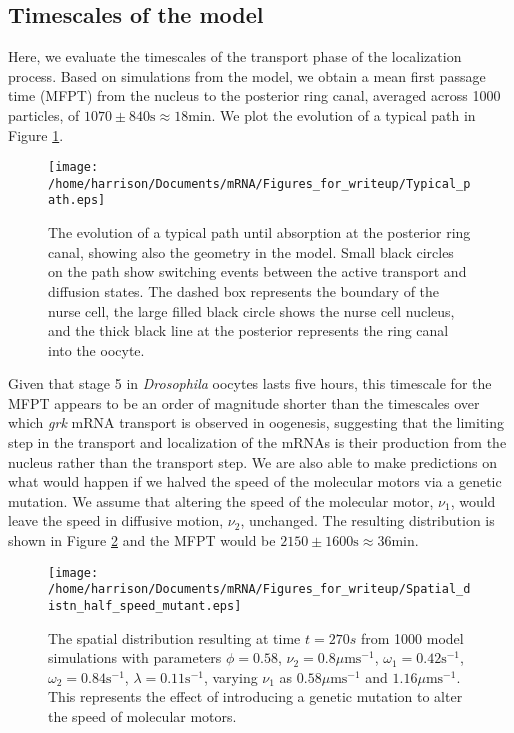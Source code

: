 \documentclass[twocolumn]{biophys}
\begin{document}
\subsection{Timescales of the model}
Here, we evaluate the timescales of the transport phase of the localization process.
Based on simulations from the model, we obtain a mean first passage time (MFPT) from the nucleus to the posterior ring canal, averaged across 1000 particles, of $1070 \pm 840 \text{s} \approx 18 \text{min}$.
We plot the evolution of a typical path in Figure \ref{FIG:Typical_path}.
\begin{figure}[h]
 \centering
 \texttt{[image: /home/harrison/Documents/mRNA/Figures\_for\_writeup/Typical\_path.eps]}
 \caption{The evolution of a typical path until absorption at the posterior ring canal, showing also the geometry in the model. Small black circles on the path show switching events between the active transport and diffusion states. The dashed box represents the boundary of the nurse cell, the large filled black circle shows the nurse cell nucleus, and the thick black line at the posterior represents the ring canal into the oocyte.}
 \label{FIG:Typical_path}
\end{figure}
Given that stage 5 in \textit{Drosophila} oocytes lasts five hours, this timescale for the MFPT appears to be an order of magnitude shorter than the timescales over which \textit{grk} mRNA transport is observed in oogenesis, suggesting that the limiting step in the transport and localization of the mRNAs is their production from the nucleus rather than the transport step.
We are also able to make predictions on what would happen if we halved the speed of the molecular motors via a genetic mutation.
We assume that altering the speed of the molecular motor, $\nu_1$, would leave the speed in diffusive motion, $\nu_2$, unchanged.
The resulting distribution is shown in Figure \ref{FIG:Half_speed_q} and the MFPT would be $2150\pm1600 \text{s} \approx 36\text{min}$.
\begin{figure}[h]
 \centering
 \texttt{[image: /home/harrison/Documents/mRNA/Figures\_for\_writeup/Spatial\_distn\_half\_speed\_mutant.eps]}
 \caption{The spatial distribution resulting at time $t=270s$ from 1000 model simulations with parameters $\phi=0.58$, $\nu_2=0.8 \mu \text{ms}^{-1}$, $\omega_1=0.42 \text{s}^{-1}$, $\omega_2=0.84 \text{s}^{-1}$, $\lambda=0.11 \text{s}^{-1}$, varying $\nu_1$ as $0.58\mu \text{ms}^{-1}$ and $1.16\mu \text{ms}^{-1}$. 
 This represents the effect of introducing a genetic mutation to alter the speed of molecular motors.}
 \label{FIG:Half_speed_q}
\end{figure}
\end{document}
